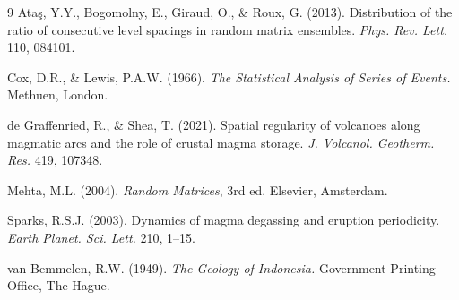 \documentclass[11pt]{article}
\begin{document}
\begin{thebibliography}{9}
Ata\c{s}, Y.Y., Bogomolny, E., Giraud, O., \& Roux, G. (2013).
Distribution of the ratio of consecutive level spacings in random matrix
ensembles. \emph{Phys. Rev. Lett.} 110, 084101.

Cox, D.R., \& Lewis, P.A.W. (1966).
\emph{The Statistical Analysis of Series of Events.} Methuen, London.

de Graffenried, R., \& Shea, T. (2021).
Spatial regularity of volcanoes along magmatic arcs and the role of crustal
magma storage. \emph{J. Volcanol. Geotherm. Res.} 419, 107348.

Mehta, M.L. (2004). \emph{Random Matrices}, 3rd ed. Elsevier, Amsterdam.

Sparks, R.S.J. (2003).
Dynamics of magma degassing and eruption periodicity.
\emph{Earth Planet. Sci. Lett.} 210, 1--15.

van Bemmelen, R.W. (1949).
\emph{The Geology of Indonesia.} Government Printing Office, The Hague.
\end{thebibliography}
\end{document}

